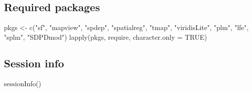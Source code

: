 \documentclass[
  letterpaper,
  DIV=11,
  numbers=noendperiod]{scrreprt}
\newenvironment{Shaded}{\begin{snugshade}}{\end{snugshade}}
\newcommand{\AttributeTok}[1]{\textcolor[rgb]{0.40,0.45,0.13}{#1}}
\newcommand{\ConstantTok}[1]{\textcolor[rgb]{0.56,0.35,0.01}{#1}}
\newcommand{\FunctionTok}[1]{\textcolor[rgb]{0.28,0.35,0.67}{#1}}
\newcommand{\NormalTok}[1]{\textcolor[rgb]{0.00,0.23,0.31}{#1}}
\newcommand{\OtherTok}[1]{\textcolor[rgb]{0.00,0.23,0.31}{#1}}
\newcommand{\StringTok}[1]{\textcolor[rgb]{0.13,0.47,0.30}{#1}}
\begin{document}
\hypertarget{required-packages-10}{%
\subsection*{Required packages}\label{required-packages-10}}

\begin{Shaded}
\begin{Highlighting}[]
\NormalTok{pkgs }\OtherTok{\textless{}{-}} \FunctionTok{c}\NormalTok{(}\StringTok{"sf"}\NormalTok{, }\StringTok{"mapview"}\NormalTok{, }\StringTok{"spdep"}\NormalTok{, }\StringTok{"spatialreg"}\NormalTok{, }\StringTok{"tmap"}\NormalTok{, }\StringTok{"viridisLite"}\NormalTok{, }
          \StringTok{"plm"}\NormalTok{, }\StringTok{"lfe"}\NormalTok{, }\StringTok{"splm"}\NormalTok{, }\StringTok{"SDPDmod"}\NormalTok{)}
\FunctionTok{lapply}\NormalTok{(pkgs, require, }\AttributeTok{character.only =} \ConstantTok{TRUE}\NormalTok{)}
\end{Highlighting}
\end{Shaded}

\hypertarget{session-info-10}{%
\subsection*{Session info}\label{session-info-10}}

\begin{Shaded}
\begin{Highlighting}[]
\FunctionTok{sessionInfo}\NormalTok{()}
\end{Highlighting}
\end{Shaded}
\end{document}
